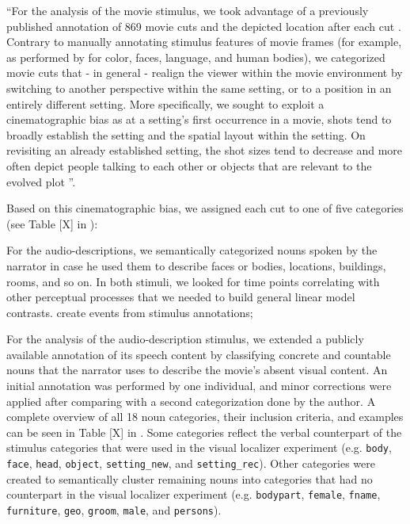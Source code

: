 ``For the analysis of the movie stimulus, we took advantage of a previously
published annotation of 869 movie cuts and the depicted location after each cut
\citep{haeusler2016cutanno}.
Contrary to manually annotating stimulus features of movie frames (for example,
as performed by \citet{bartels2004mapping} for color, faces, language, and human
bodies), we categorized movie cuts that - in general - realign the viewer within
the movie environment by switching to another perspective within the same
setting, or to a position in an entirely different setting.
More specifically, we sought to exploit a cinematographic bias as
at a setting's first occurrence in a movie, shots tend to broadly establish the
setting and the spatial layout within the setting.
On revisiting an already established setting, the shot sizes tend to decrease
and more often depict people talking to each other or objects that are relevant
to the evolved plot
\citep{brown2012cinematography, katz1991film, mascelli1998five}''.

Based on this cinematographic bias, we assigned each cut to one of five
categories (see Table [X] in \citep{haeusler2022processing}):
%


%
For the audio-descriptions, we semantically categorized nouns spoken by the
narrator in case he used them to describe faces or bodies, locations, buildings,
rooms, and so on.
%
In both stimuli, we looked for time points correlating with other perceptual
processes that we needed to build general linear model contrasts.
%
create events from stimulus annotations;

For the analysis of the audio-description stimulus, we extended a publicly
available annotation of its speech content \citep{haeusler2021speechanno} by
classifying concrete and countable nouns that the narrator uses to describe the
movie's absent visual content.
An initial annotation was performed by one individual,
and minor corrections were applied after comparing with a second categorization
done by the author.
A complete overview of all 18 noun categories, their inclusion criteria, and
examples can be seen in Table [X] in \citep{haeusler2022processing}.
Some categories reflect the verbal counterpart of the stimulus categories that
were used in the visual localizer experiment (e.g. \texttt{body}, \texttt{face},
\texttt{head}, \texttt{object}, \texttt{setting\_new}, and
\texttt{setting\_rec}).
Other categories were created to semantically cluster remaining nouns into
categories that had no counterpart in the visual localizer experiment (e.g.
\texttt{bodypart}, \texttt{female}, \texttt{fname}, \texttt{furniture},
\texttt{geo}, \texttt{groom}, \texttt{male}, and \texttt{persons}).



